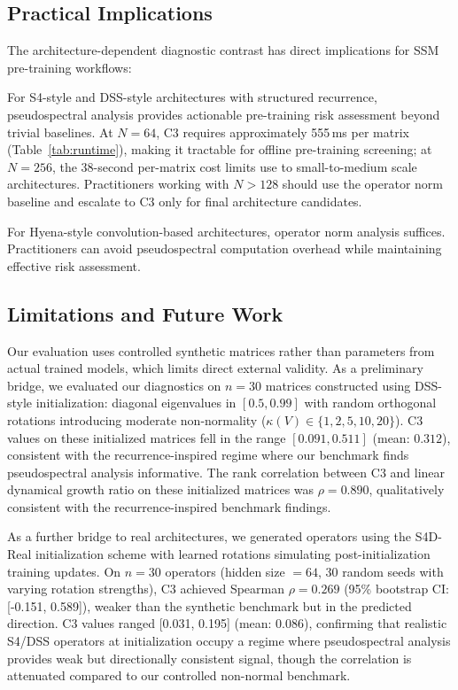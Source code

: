 \documentclass[twoside]{article}
\begin{document}
\subsection{Practical Implications}

The architecture-dependent diagnostic contrast has direct implications for SSM pre-training workflows:

For S4-style and DSS-style architectures with structured recurrence, pseudospectral analysis provides actionable pre-training risk assessment beyond trivial baselines. At $N=64$, C3 requires approximately 555\,ms per matrix (Table~\ref{tab:runtime}), making it tractable for offline pre-training screening; at $N=256$, the 38-second per-matrix cost limits use to small-to-medium scale architectures. Practitioners working with $N > 128$ should use the operator norm baseline and escalate to C3 only for final architecture candidates.

For Hyena-style convolution-based architectures, operator norm analysis suffices. Practitioners can avoid pseudospectral computation overhead while maintaining effective risk assessment.

\subsection{Limitations and Future Work}
\label{sec:limitations}

Our evaluation uses controlled synthetic matrices rather than parameters from actual trained models, which limits direct external validity. As a preliminary bridge, we evaluated our diagnostics on $n=30$ matrices constructed using DSS-style initialization: diagonal eigenvalues in $[0.5, 0.99]$ with random orthogonal rotations introducing moderate non-normality ($\kappa(V) \in \{1, 2, 5, 10, 20\}$). C3 values on these initialized matrices fell in the range $[0.091, 0.511]$ (mean: $0.312$), consistent with the recurrence-inspired regime where our benchmark finds pseudospectral analysis informative. The rank correlation between C3 and linear dynamical growth ratio on these initialized matrices was $\rho = 0.890$, qualitatively consistent with the recurrence-inspired benchmark findings.

As a further bridge to real architectures, we generated operators using the S4D-Real initialization scheme \citep{gu2022efficiently} with learned rotations simulating post-initialization training updates. On $n = 30$ operators (hidden size $= 64$, 30 random seeds with varying rotation strengths), C3 achieved Spearman $\rho = 0.269$ (95\% bootstrap CI: [-0.151, 0.589]), weaker than the synthetic benchmark but in the predicted direction. C3 values ranged [0.031, 0.195] (mean: 0.086), confirming that realistic S4/DSS operators at initialization occupy a regime where pseudospectral analysis provides weak but directionally consistent signal, though the correlation is attenuated compared to our controlled non-normal benchmark.
\end{document}
